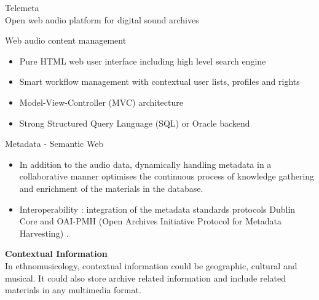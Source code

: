 \documentclass[final, hyperref, table]{beamer}
\begin{document}
\begin{frame}[containsverbatim]{}
\begin{columns}[T]
\begin{column}[T]{.5\linewidth}
\begin{block}{{\Large Telemeta}\\Open web audio platform for
          digital sound archives}
\begin{center}
\begin{minipage}[h]{0.97\linewidth}
\begin{block}{Web audio content management}
\begin{multicols}{2}[]
              \begin{itemize}
              \item \alert{Pure HTML} web user interface including
                high level \alert{search engine}
              \item \alert{Smart workflow management} with contextual
                user lists, profiles and rights
              \item Model-View-Controller (\alert{MVC}) architecture
              \item Strong Structured Query Language (\alert{SQL}) or
                Oracle backend
              \end{itemize}
            \end{multicols}
            
          \end{block}
          \begin{block}{Metadata - Semantic Web}
            \vspace{-0.5cm}
            \begin{itemize}
            \item In addition to the audio data, dynamically handling
              metadata in a \alert{collaborative} manner optimises the
              continuous process of knowledge gathering and enrichment
              of the materials in the database.
            \item Interoperability : integration of the metadata
              standards protocols \alert{Dublin Core} and
              \alert{OAI-PMH} (Open Archives Initiative Protocol for
              Metadata Harvesting) \cite{DublinCore,OAI-PMH}.
            \end{itemize}
        
            \textbf{Contextual Information}\\
            In ethnomusicology, contextual information could be
            geographic, cultural and musical. It could also store
            archive related information and include related materials
            in any multimedia format.
        

\end{block}
\end{minipage}
\end{center}
\end{block}
\end{column}
\end{columns}
\end{frame}
\end{document}
